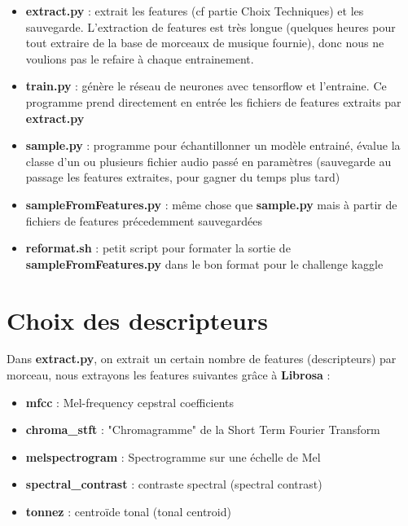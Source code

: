 \documentclass{article}
\begin{document}
\begin{itemize}
  
\item \textbf{extract.py} : extrait les features (cf partie Choix Techniques) et les sauvegarde. L'extraction de features est très longue (quelques heures pour tout extraire de la base de morceaux de musique fournie), donc nous ne voulions pas le refaire à chaque entrainement.
  
\item \textbf{train.py} : génère le réseau de neurones avec tensorflow et l'entraine. Ce programme prend directement en entrée les fichiers de features extraits par \textbf{extract.py}

\item \textbf{sample.py} : programme pour échantillonner un modèle entrainé, évalue la classe d'un ou plusieurs fichier audio passé en paramètres (sauvegarde au passage les features extraites, pour gagner du temps plus tard)

\item \textbf{sampleFromFeatures.py} : même chose que \textbf{sample.py} mais à partir de fichiers de features précedemment sauvegardées

\item \textbf{reformat.sh} : petit script pour formater la sortie de \textbf{sampleFromFeatures.py} dans le bon format pour le challenge kaggle
  
\end{itemize}

\section*{Choix des descripteurs}

Dans \textbf{extract.py}, on extrait un certain nombre de features (descripteurs) par morceau, nous extrayons les features suivantes grâce à \textbf{Librosa} :

\begin{itemize}

  \item \textbf{mfcc} : Mel-frequency cepstral coefficients 
  \item \textbf{chroma\_stft} : "Chromagramme" de la  Short Term Fourier Transform
  \item \textbf{melspectrogram} : Spectrogramme sur une échelle de Mel
  \item \textbf{spectral\_contrast} : contraste spectral (spectral contrast)
  \item \textbf{tonnez} : centroïde tonal (tonal centroid)
    
\end{itemize}
\end{document}
